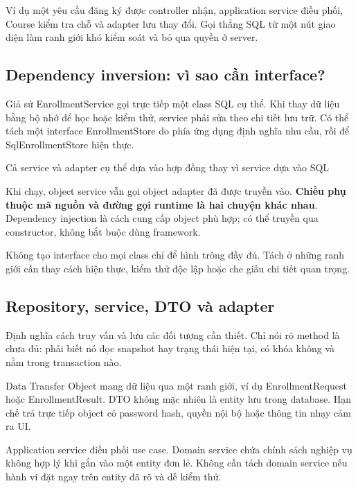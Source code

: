 Ví dụ một yêu cầu đăng ký được controller nhận, application service điều phối, Course kiểm tra chỗ và adapter lưu thay đổi. Gọi thẳng SQL từ một nút giao diện làm ranh giới khó kiểm soát và bỏ qua quyền ở server.

\subsection{Dependency inversion: vì sao cần interface?}
Giả sử EnrollmentService gọi trực tiếp một class SQL cụ thể. Khi thay dữ liệu bằng bộ nhớ để học hoặc kiểm thử, service phải sửa theo chi tiết lưu trữ. Có thể tách một interface EnrollmentStore do phía ứng dụng định nghĩa nhu cầu, rồi để SqlEnrollmentStore hiện thực.

  {Cả service và adapter cụ thể dựa vào hợp đồng thay vì service dựa vào SQL}

Khi chạy, object service vẫn gọi object adapter đã được truyền vào. \textbf{Chiều phụ thuộc mã nguồn và đường gọi runtime là hai chuyện khác nhau}. Dependency injection là cách cung cấp object phù hợp; có thể truyền qua constructor, không bắt buộc dùng framework.

Không tạo interface cho mọi class chỉ để hình trông đầy đủ. Tách ở những ranh giới cần thay cách hiện thực, kiểm thử độc lập hoặc che giấu chi tiết quan trọng.

\subsection{Repository, service, DTO và adapter}
Định nghĩa cách truy vấn và lưu các đối tượng cần thiết. Chỉ nói rõ method là chưa đủ: phải biết nó đọc snapshot hay trạng thái hiện tại, có khóa không và nằm trong transaction nào.

Data Transfer Object mang dữ liệu qua một ranh giới, ví dụ EnrollmentRequest hoặc EnrollmentResult. DTO không mặc nhiên là entity lưu trong database. Hạn chế trả trực tiếp object có password hash, quyền nội bộ hoặc thông tin nhạy cảm ra UI.

Application service điều phối use case. Domain service chứa chính sách nghiệp vụ không hợp lý khi gắn vào một entity đơn lẻ. Không cần tách domain service nếu hành vi đặt ngay trên entity đã rõ và dễ kiểm thử.

